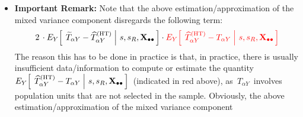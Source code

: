 \begin{itemize}
\begin{eqnarray*}
            \,\right)
    \\
    &&
        +\;
        2\cdot
        E_{Y}\!\left[\;
            \left.
            \widetilde{T}_{\alpha Y} - \widehat{T}^{\textnormal{(HT)}}_{\alpha Y}
            \;\right\vert\,
            s,s_{R},\Xobs
            \,\right]
        \cdot
        {\color{red}E_{Y}\!\left[\;
            \left.
            \widehat{T}^{\textnormal{(HT)}}_{\alpha Y} - T_{\alpha Y}
            \;\right\vert\,
            s,s_{R},\Xobs
            \,\right]}
    \\
    & {\color{red}\approx} &
        2\cdot
        \Cov_{Y}\!\left(\,
            \left.
            \widetilde{T}_{\alpha Y} - \widehat{T}^{\textnormal{(HT)}}_{\alpha Y}
            \,,\,
            \widehat{T}^{\textnormal{(HT)}}_{\alpha Y} - T_{\alpha Y}
            \;\right\vert\,
            s,s_{R},\Xobs
            \,\right)
    \\
    & = &
        {\color{blue}
        2\,\cdot\!\left(\;
            \underset{l \in s_{R}}{\sum}\,
                W^{(+)}_{\alpha,kl}\,(w_{l}-1)\,d_{l}\,\sigma_{l}^{2}
            \;\,-\;
            \underset{k \in s_{M}}{\sum}\,
                w_{k}\,(w_{1}-1)\,d_{k}^{2}\,\sigma_{k}^{2}
            \,\right)
        }
    \end{eqnarray*}
\item
    \textbf{Important Remark:}
    \vskip 0.05cm
    \noindent
    Note that the above estimation/approximation of the mixed variance component
    disregards the following term:
    \begin{equation*}
    2\,\cdot E_{Y}\!\left[\;
        \left.
        \widetilde{T}_{\alpha Y} - \widehat{T}^{\textnormal{(HT)}}_{\alpha Y}
        \;\right\vert\,
        s,s_{R},\mathbf{X}_{\bullet\bullet}
        \,\right]
    \cdot
    {\color{red}E_{Y}\!\left[\;
        \left.
        \widehat{T}^{\textnormal{(HT)}}_{\alpha Y} - T_{\alpha Y}
        \;\right\vert\,
        s,s_{R},\mathbf{X}_{\bullet\bullet}\,\right]}
    \end{equation*}
    The reason this has to be done in practice is that, in practice,
    there is usually insufficient data/information to compute or estimate
    the quantity
    \,$
    E_{Y}\!\left[\;
        \left.
        \widehat{T}^{\textnormal{(HT)}}_{\alpha Y} - T_{\alpha Y}
        \;\right\vert\,
        s,s_{R},\mathbf{X}_{\bullet\bullet}
        \,\right]
    $\,
    (indicated in red above), as \,$T_{\alpha Y}$\, involves population units
    that are not selected in the sample.
    \vskip 0.1cm
    \noindent
    Obviously, the above estimation/approximation of the mixed variance component

\end{itemize}
